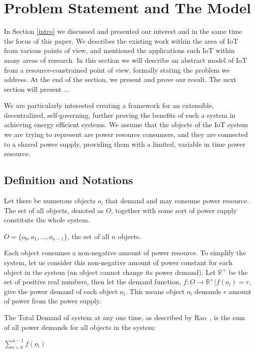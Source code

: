 \documentclass[../main/Self-Stabilization.tex]{subfiles}
\begin{document}
\section{Problem Statement and The Model}\label{problem}
In Section \ref{intro} we discussed and presented our interest and in the same time the focus of this paper. We describes the existing work within the area of IoT from various points of view, and mentioned the applications such IoT within many areas of research. In this section we will describe an abstract model of IoT from a resource-constrained point of view, formally stating the problem we address. At the end of the section, we present and prove our result. The next section will present ...

We are particularly interested creating a framework for an extensible, decentralized, self-governing, further proving the benefits of such a system in achieving energy efficient systems. We assume that the objects of the IoT system we are trying to represent are power resource consumers, and they are connected to a shared power supply, providing them with a limited, variable in time power resource.

\subsection{Definition and Notations}
Let there be numerous objects $o_{i}$ that demand and may consume power resource. The set of all objects, denoted as $O$, together with some sort of power supply constitute the whole system.
 \begin{center}
    $O=\{o_{0}, o_{1}, ...,o_{n-1}\}$, the set of all $n$ objects.
 \end{center}
Each object consumes a non-negative amount of power resource. To simplify the system, let us consider this non-negative amount of power constant for each object in the system (an object cannot change its power demand). Let $\mathbb{R^+}$ be the set of positive real numbers, then let the demand function, $f:O\rightarrow\mathbb{R^+} | f(o_{i})=r$, give the power demand of each object $o_{i}$. This means object $o_{i}$ demands $r$ amount of power from the power supply.

The Total Demand of system at any one time, as described by Rao~\cite{rao2011foundation}, is the sum of all power demands for all objects in the system:
\begin{center}
   $\sum\limits_{i=0}^{n-1} f(o_i)$
\end{center}
\end{document}
